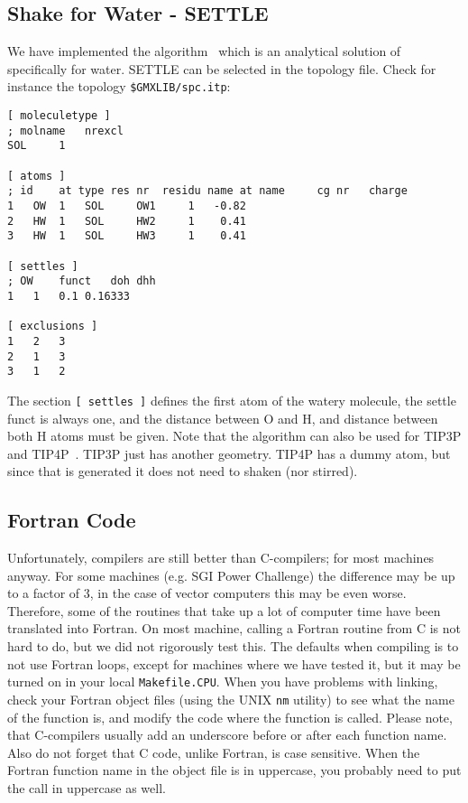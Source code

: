 \subsection{Shake for Water - SETTLE}
\label{sec:settle}
We have implemented the  algorithm~\cite{Miyamoto92} which is
an analytical solution of  specifically for water. 
SETTLE can be selected in the topology file. Check for instance the
topology {\tt \$GMXLIB/spc.itp}:
\begin{verbatim}
[ moleculetype ]
; molname	nrexcl
SOL		1

[ atoms ]
; id	at type	res nr 	residu name	at name		cg nr	charge
1	OW	1	SOL		OW1		1	-0.82
2	HW	1	SOL		HW2		1	 0.41
3	HW	1	SOL		HW3		1	 0.41

[ settles ]
; OW	funct	doh	dhh
1	1	0.1	0.16333

[ exclusions ]
1	2	3
2	1	3
3	1	2
\end{verbatim}
The section {\tt [ settles ]} defines the first atom of the watery molecule,
the settle funct is always one, and the distance between O and H, and distance
between both H atoms must be given. Note that the algorithm can also be used
for TIP3P and TIP4P~\cite{Jorgensen83}.
TIP3P just has another geometry. TIP4P has a dummy atom, but since 
that is generated it does not need to shaken (nor stirred).

\subsection{Fortran Code}
Unfortunately,  compilers are still better than C-compilers;
for most machines anyway. For some machines (e.g. SGI Power Challenge)
the difference may be up to a factor of 3, in the case of vector
computers this may be even worse. Therefore, some of the routines
that take up a lot of computer time have been translated into Fortran.
On most machine, calling a Fortran routine from C is not hard to do,
but we did not rigorously test this. The defaults when compiling
{\gromacs} is to not use Fortran loops, except for machines where we
have tested it, but it may be turned on
in your local {\tt Makefile.CPU}. When you have problems with linking,
check your Fortran object files (using the UNIX {\tt nm} utility)
to see what the name of the function is, and modify the code where the
function is called. Please note, that C-compilers usually add an underscore
before or after each function name. Also do not forget that C code,
unlike Fortran, is case sensitive. When the Fortran function name in the
object file is in uppercase, you probably need to put the
call in uppercase as well. 


